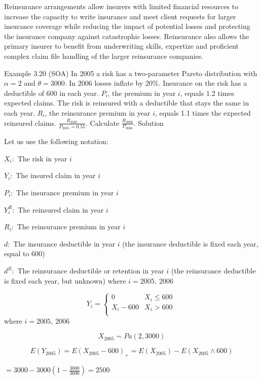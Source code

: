\documentclass[]{book}
\begin{document}
Reinsurance arrangements allow insurers with limited financial resources
to increase the capacity to write insurance and meet client requests for
larger insurance coverage while reducing the impact of potential losses
and protecting the insurance company against catastrophic losses.
Reinsurance also allows the primary insurer to benefit from underwriting
skills, expertize and proficient complex claim file handling of the
larger reinsurance companies.

Example 3.20 (SOA) In 2005 a risk has a two-parameter Pareto
distribution with \(\alpha = 2\) and \(\theta = 3000\). In 2006 losses
inflate by 20\%. Insurance on the risk has a deductible of 600 in each
year. \(P_{i}\), the premium in year \(i\), equals 1.2 times expected
claims. The risk is reinsured with a deductible that stays the same in
each year. \(R_{i}\), the reinsurance premium in year \(i\), equals 1.1
times the expected reinsured claims.
\(\frac{R_{2005}}{P_{2005} = 0.55}\). Calculate
\(\frac{R_{2006}}{P_{2006}}\). Solution

Let us use the following notation:

\(X_{i}:\) The risk in year \(i\)

\(Y_{i}:\) The insured claim in year \(i\)

\(P_{i}:\) The insurance premium in year \(i\)

\(Y_{i}^{R}:\) The reinsured claim in year \(i\)

\(R_{i}:\) The reinsurance premium in year \(i\)

\(d:\) The insurance deductible in year \(i\) (the insurance deductible
is fixed each year, equal to 600)

\(d^{R}:\) The reinsurance deductible or retention in year \(i\) (the
reinsurance deductible is fixed each year, but unknown) where
\(i = 2005,\ 2006\)

\[Y_{i} = \left\{ \begin{matrix}
0 & X_{i} \leq 600 \\
X_{i} - 600 & X_{i} > 600 \\
\end{matrix} \right.\ \] where \(i = 2005,\ 2006\)

\[X_{2005}\sim Pa\left( 2,3000 \right)\]

\[E\left( Y_{2005} \right) = E\left( X_{2005} - 600 \right)_{+} = E\left( X_{2005} \right) - E\left( X_{2005} \land 600 \right)\]

\(= 3000 - 3000\left( 1 - \frac{3000}{3600} \right) = 2500\)
\end{document}
